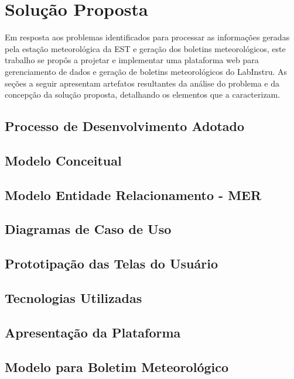 \chapter{Solução Proposta} \label{cap:solucao}

Em resposta aos problemas identificados para processar as informações geradas pela estação meteorológica da EST e geração dos boletins meteorológicos, este trabalho se propôs a projetar e implementar uma plataforma web para gerenciamento de dados e geração de boletins meteorológicos do LabInstru. As seções a seguir apresentam artefatos resultantes da análise do problema e da concepção da solução proposta, detalhando os elementos que a caracterizam.


\section{Processo de Desenvolvimento Adotado}


\section{Modelo Conceitual}


\section{Modelo Entidade Relacionamento - MER}


\section{Diagramas de Caso de Uso}


\section{Prototipação das Telas do Usuário}


\section{Tecnologias Utilizadas}


\section{Apresentação da Plataforma}


\section{Modelo para Boletim Meteorológico}

